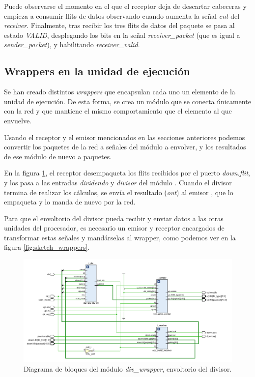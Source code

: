 Puede observarse el momento en el que el receptor deja de descartar cabeceras y empieza a consumir flits de datos observando cuando aumenta la señal \textit{cnt} del \textit{receiver}. Finalmente, tras recibir los tres flits de datos del paquete se pasa al estado \textit{VALID}, desplegando los bits en la señal \textit{receiver\_packet} (que es igual a \textit{sender\_packet}), y habilitando \textit{receiver\_valid}.

\subsection{Wrappers en la unidad de ejecución}

Se han creado distintos \textit{wrappers} que encapsulan cada uno un elemento de la unidad de ejecución. De esta forma, se crea un módulo que se conecta únicamente con la red y que mantiene el mismo comportamiento que el elemento al que envuelve.

Usando el receptor y el emisor mencionados en las secciones anteriores podemos convertir los paquetes de la red a señales del módulo a envolver, y los resultados de ese módulo de nuevo a paquetes.

En la figura \ref{fig:schematic_div_wrapper}, el receptor  desempaqueta los flits recibidos por el puerto \textit{down.flit}, y los pasa a las entradas \textit{dividendo} y \textit{divisor} del módulo . Cuando el divisor termina de realizar los cálculos, se envía el resultado (\textit{out}) al emisor , que lo empaqueta y lo manda de nuevo por la red.

Para que el envoltorio del divisor pueda recibir y enviar datos a las otras unidades del procesador, es necesario un emisor y receptor encargados de transformar estas señales y mandárselas al wrapper, como podemos ver en la figura \ref{fig:sketch_wrappers}.

\begin{figure}[h]
    \centering
    \includegraphics[width=\linewidth]{images/schematics/div_wrapper.png}
    \caption[Diagrama de bloques del módulo \textit{div\_wrapper}]{Diagrama de bloques del módulo \textit{div\_wrapper}, envoltorio del divisor.}
    \label{fig:schematic_div_wrapper}
\end{figure}

